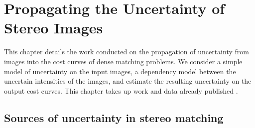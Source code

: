\chapter{Propagating the Uncertainty of Stereo Images}
This chapter details the work conducted on the propagation of uncertainty from images into the cost curves of dense matching problems. We consider a simple model of uncertainty on the input images, a dependency model between the uncertain intensities of the images, and estimate the resulting uncertainty on the output cost curves. This chapter takes up work and data already published \cite{malinowski_copulas_2022, malinowski_uncertainty_2023, malinowski_robust_2024}.

\section{Sources of uncertainty in stereo matching}

